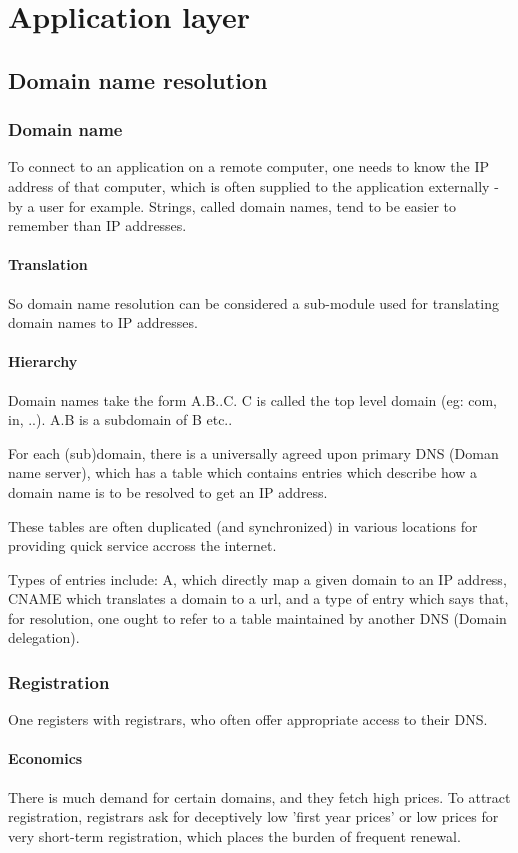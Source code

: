 \documentclass[oneside, article]{memoir}
\begin{document}
\part{Application layer}
\chapter{Domain name resolution}
\section{Domain name}
To connect to an application on a remote computer, one needs to know the IP address of that computer, which is often supplied to the application externally - by a user for example. Strings, called domain names, tend to be easier to remember than IP addresses. 

\subsection{Translation}
So domain name resolution can be considered a sub-module used for translating domain names to IP addresses.

\subsection{Hierarchy}
Domain names take the form A.B..C. C is called the top level domain (eg: com, in, ..). A.B is a subdomain of B etc..

For each (sub)domain, there is a universally agreed upon primary DNS (Doman name server), which has a table which contains entries which describe how a domain name is to be resolved to get an IP address.

These tables are often duplicated (and synchronized) in various locations for providing quick service accross the internet.

Types of entries include: A, which directly map a given domain to an IP address, CNAME which translates a domain to a url, and a type of entry which says that, for resolution, one ought to refer to a table maintained by another DNS (Domain delegation). 

\section{Registration}
One registers with registrars, who often offer appropriate access to their DNS.

\subsection{Economics}
There is much demand for certain domains, and they fetch high prices. To attract registration, registrars ask for deceptively low 'first year prices' or low prices for very short-term registration, which places the burden of frequent renewal.
\end{document}
